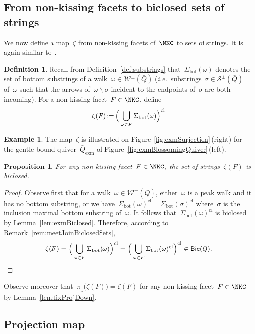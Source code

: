 \documentclass{amsart}
\newtheorem{proposition}[theorem]{Proposition}
\theoremstyle{definition}
\newtheorem{definition}[theorem]{Definition}
\newtheorem{example}[theorem]{Example}
\newcommand{\ssm}{\smallsetminus} %
\newcommand{\eqdef}{\mbox{\,\raisebox{0.2ex}{\scriptsize\ensuremath{\mathrm:}}\ensuremath{=}\,}} %
\newcommand{\fref}[1]{Figure~\ref{#1}} %
\newcommand{\ie}{\textit{i.e.}~} %
\newcommand{\ex}{_{\textrm{exm}}} %
\newcommand{\strings}{\mathcal{S}} %
\newcommand{\walks}{\mathcal{W}} %
\newcommand{\bottom}{\mathrm{bot}} %
\newcommand{\closure}[1]{#1^{\mathrm{cl}}} %
\newcommand{\Bicl}[1]{\mathsf{Bic}(#1)} %
\newcommand{\projDown}{\pi_\downarrow} %
\begin{document}
\subsection{From non-kissing facets to biclosed sets of strings}

We now define a map~$\zeta$ from non-kissing facets of~$\NKC$ to sets of strings.
It is again similar to~\cite[Sect.~8]{McConville}.

\begin{definition}
\label{def:zeta}
Recall from Definition~\ref{def:substrings} that~$\Sigma_\bottom(\omega)$ denotes the set of bottom substrings of a walk~$\omega \in \walks^\pm(\bar Q)$ (\ie substrings~$\sigma \in \strings^\pm(\bar Q)$ of~$\omega$ such that the arrows of~$\omega \ssm \sigma$ incident to the endpoints of~$\sigma$ are both incoming).
For a non-kissing facet~$F \in \NKC$, define
\[
\zeta(F) \eqdef \closure{\Big( \bigcup_{\omega \in F} \Sigma_\bottom(\omega) \Big)}
\]
\end{definition}

\begin{example}
The map~$\zeta$ is illustrated on \fref{fig:exmSurjection}\,(right)  for the gentle bound quiver~$\bar Q\ex$ of \fref{fig:exmBlossomingQuiver}\,(left).
\end{example}

\begin{proposition}
For any non-kissing facet~$F \in \NKC$, the set of strings~$\zeta(F)$ is biclosed.
\end{proposition}

\begin{proof}
Observe first that for a walk~$\omega \in \walks^\pm(\bar Q)$, either~$\omega$ is a peak walk and it has no bottom substring, or we have~$\closure{\Sigma_\bottom(\omega)} = \closure{\Sigma_\bottom(\sigma)}$ where~$\sigma$ is the inclusion maximal bottom substring of~$\omega$.
It follows that~$\closure{\Sigma_\bottom(\omega)}$ is biclosed by Lemma~\ref{lem:exmBiclosed}.
Therefore, according to Remark~\ref{rem:meetJoinBiclosedSets},
\[
\zeta(F) = \closure{\Big( \bigcup_{\omega \in F} \Sigma_\bottom(\omega) \Big)} = \closure{\Big( \bigcup_{\omega \in F} \closure{\Sigma_\bottom(\omega)} \Big)} \in \Bicl{\bar Q}. \qedhere
\]
\end{proof}

Observe moreover that~$\projDown \big( \zeta(F) \big) = \zeta(F)$ for any non-kissing facet~$F \in \NKC$ by Lemma~\ref{lem:fixProjDown}.

\subsection{Projection map}
\end{document}

